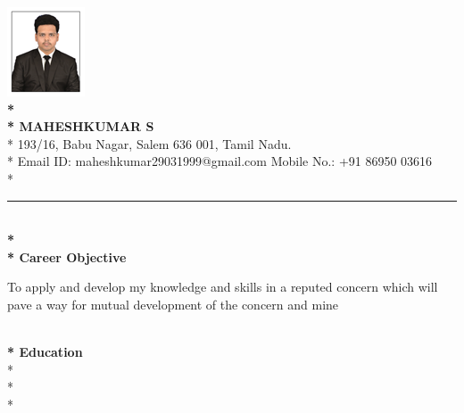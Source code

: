 \documentclass{article}
\begin{document}
\includegraphics[scale=0.7]{smk.png}
 \textbf{\LARGE \\* \\* MAHESHKUMAR S}
\\* \large 193/16, Babu Nagar, Salem 636 001, Tamil Nadu. 
\\* \large Email ID: maheshkumar29031999@gmail.com    
\hspace{10pt}Mobile No.: +91 86950 03616  
\\*
\hrule

\textbf{\\*  \\* Career Objective}

To apply and develop my knowledge and skills in a reputed concern which will pave a way for mutual development of the concern and mine

 \textbf{\\* Education}
\\*  
\\* 
\\* 
\end{document}
